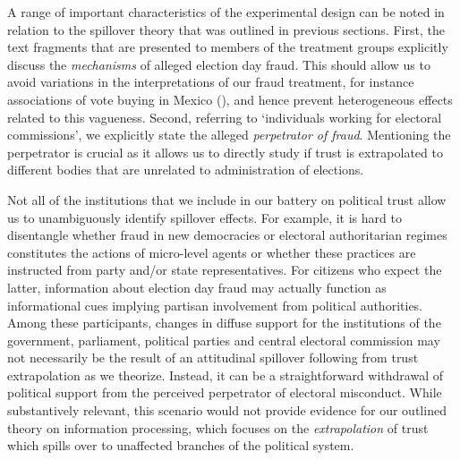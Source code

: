 \documentclass[11pt, ngerman,english,a4]{article}
\begin{document}
\doublespacing


A range of important characteristics of the experimental design can be noted in relation to the spillover theory that was outlined in previous sections.
First, the text fragments that are presented to members of the treatment groups explicitly discuss the \textit{mechanisms} of alleged election day fraud. 
This should allow us to avoid variations in the interpretations of our fraud treatment, for instance associations of vote buying in Mexico (\citealt{Cantu2019a}), and hence prevent heterogeneous effects related to this vagueness. 
Second, referring to `individuals working for electoral commissions', we explicitly state the alleged \textit{perpetrator of fraud}. 
Mentioning the perpetrator is crucial as it allows us to directly study if trust is extrapolated to different bodies that are unrelated to administration of elections. 

Not all of the institutions that we include in our battery on political trust allow us to unambiguously identify spillover effects. 
For example, it is hard to disentangle whether fraud in new democracies or electoral authoritarian regimes constitutes the actions of micro-level agents or whether these practices are instructed from party and/or state representatives. 
For citizens who expect the latter, information about election day fraud may actually function as informational cues implying partisan involvement from political authorities. 
Among these participants, changes in diffuse support for the institutions of the government, parliament, political parties and central electoral commission may not necessarily be the result of an attitudinal spillover following from trust extrapolation as we theorize.
Instead, it can be a straightforward withdrawal of political support from the perceived perpetrator of electoral misconduct. 
While substantively relevant, this scenario would not provide evidence for our outlined theory on information processing, which focuses on the \textit{extrapolation} of trust which spills over to unaffected branches of the political system.
\end{document}
